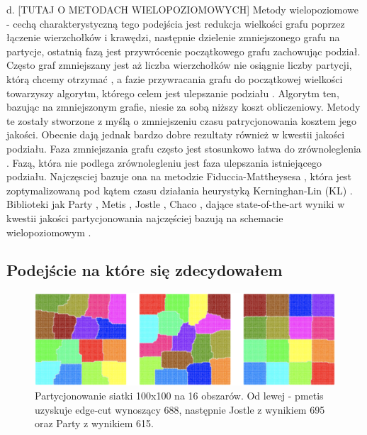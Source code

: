d. [TUTAJ O METODACH WIELOPOZIOMOWYCH] Metody wielopoziomowe
\cite{metis, jostle, Bui1993AHF, 103500, 185177, 279334, inproceedings, 129970, 10.1145/165939.165942}
- cechą charakterystyczną tego podejścia jest redukcja
wielkości grafu poprzez łączenie wierzchołków i krawędzi, następnie dzielenie zmniejszonego grafu na partycje, ostatnią fazą
jest przywrócenie początkowego grafu zachowując podział. Często graf zmniejszany jest aż liczba wierzchołków nie osiągnie
liczby partycji, którą chcemy otrzymać \cite{1364754}, a fazie przywracania grafu do początkowej wielkości towarzyszy
algorytm, którego celem jest ulepszanie podziału \cite{article}. Algorytm ten, bazując na zmniejszonym
grafie, niesie za sobą niższy koszt obliczeniowy. Metody te zostały stworzone z myślą o zmniejszeniu czasu
patrycjonowania kosztem jego jakości. Obecnie dają jednak bardzo dobre rezultaty również w kwestii jakości podziału.
Faza zmniejszania grafu często jest stosunkowo łatwa do zrównoleglenia \cite{KARYPIS199871}. Fazą, która nie podlega
zrównolegleniu jest faza ulepszania istniejącego podziału.
Najczęsciej bazuje ona na metodzie Fiduccia-Mattheysesa \cite{10.5555/800263.809204},
która jest zoptymalizowaną pod kątem czasu działania heurystyką Kerninghan-Lin (KL) \cite{6771089}.
Biblioteki jak Party \cite{1364754}, Metis \cite{metis}, Jostle \cite{jostle}, Chaco \cite{inproceedings},
dające state-of-the-art wyniki w kwestii jakości partycjonowania najczęściej bazują na schemacie wielopoziomowym
\cite{inproceedings}.

\newpage
\subsection{Podejście na które się zdecydowałem}

\begin{figure}
    \vspace{-4mm}
    \includegraphics[width=\linewidth]{images/libraries-comparision}
    \caption{Partycjonowanie siatki 100x100 na 16 obszarów. Od lewej - pmetis\cite{metis} uzyskuje edge-cut wynoszący
    688, następnie Jostle\cite{jostle} z wynikiem 695 oraz Party\cite{1364754} z wynikiem 615.}
    \label{fig:test2}
\end{figure}

